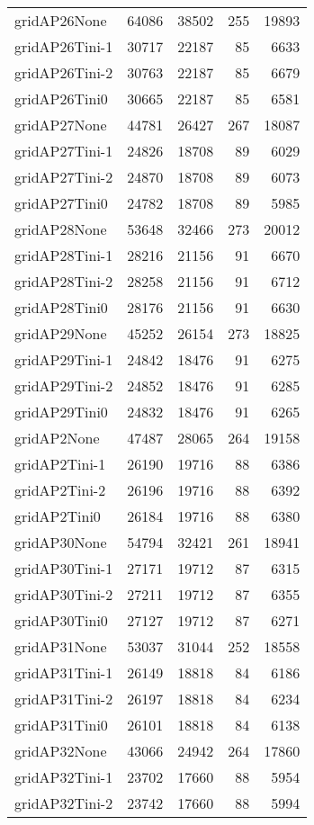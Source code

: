 \begin{longtable}{lrrrr}
gridAP26None & 64086 & 38502 & 255 & 19893 \\
gridAP26Tini-1 & 30717 & 22187 & 85 & 6633 \\
gridAP26Tini-2 & 30763 & 22187 & 85 & 6679 \\
gridAP26Tini0 & 30665 & 22187 & 85 & 6581 \\
gridAP27None & 44781 & 26427 & 267 & 18087 \\
gridAP27Tini-1 & 24826 & 18708 & 89 & 6029 \\
gridAP27Tini-2 & 24870 & 18708 & 89 & 6073 \\
gridAP27Tini0 & 24782 & 18708 & 89 & 5985 \\
gridAP28None & 53648 & 32466 & 273 & 20012 \\
gridAP28Tini-1 & 28216 & 21156 & 91 & 6670 \\
gridAP28Tini-2 & 28258 & 21156 & 91 & 6712 \\
gridAP28Tini0 & 28176 & 21156 & 91 & 6630 \\
gridAP29None & 45252 & 26154 & 273 & 18825 \\
gridAP29Tini-1 & 24842 & 18476 & 91 & 6275 \\
gridAP29Tini-2 & 24852 & 18476 & 91 & 6285 \\
gridAP29Tini0 & 24832 & 18476 & 91 & 6265 \\
gridAP2None & 47487 & 28065 & 264 & 19158 \\
gridAP2Tini-1 & 26190 & 19716 & 88 & 6386 \\
gridAP2Tini-2 & 26196 & 19716 & 88 & 6392 \\
gridAP2Tini0 & 26184 & 19716 & 88 & 6380 \\
gridAP30None & 54794 & 32421 & 261 & 18941 \\
gridAP30Tini-1 & 27171 & 19712 & 87 & 6315 \\
gridAP30Tini-2 & 27211 & 19712 & 87 & 6355 \\
gridAP30Tini0 & 27127 & 19712 & 87 & 6271 \\
gridAP31None & 53037 & 31044 & 252 & 18558 \\
gridAP31Tini-1 & 26149 & 18818 & 84 & 6186 \\
gridAP31Tini-2 & 26197 & 18818 & 84 & 6234 \\
gridAP31Tini0 & 26101 & 18818 & 84 & 6138 \\
gridAP32None & 43066 & 24942 & 264 & 17860 \\
gridAP32Tini-1 & 23702 & 17660 & 88 & 5954 \\
gridAP32Tini-2 & 23742 & 17660 & 88 & 5994 \\

\end{longtable}
